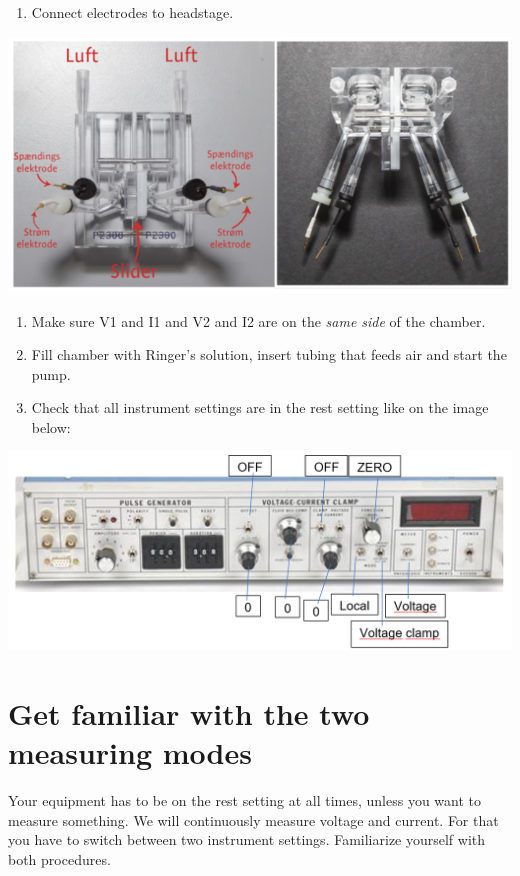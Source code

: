 \documentclass[
]{book}
\providecommand{\tightlist}{%
  \setlength{\itemsep}{0pt}\setlength{\parskip}{0pt}}
\begin{document}
\begin{enumerate}
\def\labelenumi{\arabic{enumi}.}
\setcounter{enumi}{2}
\tightlist
\item
  Connect electrodes to headstage.
\end{enumerate}

\includegraphics[width=11.31in]{images/Electrode placements}

\begin{enumerate}
\def\labelenumi{\arabic{enumi}.}
\setcounter{enumi}{3}
\item
  Make sure V1 and I1 and V2 and I2 are on the \emph{same side} of the chamber.
\item
  Fill chamber with Ringer's solution, insert tubing that feeds air and start the pump.
\item
  Check that all instrument settings are in the rest setting like on the image below:
\end{enumerate}

\includegraphics[width=20.86in]{images/Equipment settings}

\section{Get familiar with the two measuring modes}\label{get-familiar-with-the-two-measuring-modes}

Your equipment has to be on the rest setting at all times, unless you want to measure something. We will continuously measure voltage and current. For that you have to switch between two instrument settings. Familiarize yourself with both procedures.
\end{document}
